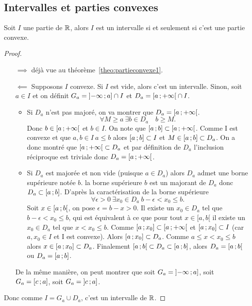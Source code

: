 \subsection{Intervalles et parties convexes}

\begin{theo}
  Soit \(I\) une partie de \(\mathbb{R}\), alors \(I\) est un intervalle si et seulement si c'est une partie convexe.
\end{theo}
\begin{proof}
  \begin{itemize}
  \item[\(\implies\)] déjà vue au théorème~\ref{theo:partieconvexe1}.
  \item[\(\impliedby\)] Supposons \(I\) convexe. Si \(I\) est vide, alors c'est un intervalle. Sinon, soit \(a\in I\) et on définit \(G_a=\left] -\infty \, ;  a \right]\cap I\) et \(D_a=\left[ a \, ;  +\infty \right[\cap I\).
    \begin{itemize}
    \item Si \(D_a\) n'est pas majoré, on va montrer que \(D_a=\left[ a \, ;  +\infty \right[\).
      \begin{equation}
        \forall M \geqslant a \ \exists b \in D_a \quad b\geqslant M.
      \end{equation}
      Donc \(b\in \left[ a \, ;  +\infty \right[\) et \(b\in I\). On note que \(\left[ a \, ;  b \right]\subset \left[ a \, ;  +\infty \right[\). Comme I est convexe et que \(a,b \in I \ a \leqslant b\) alors \(\left[ a \, ;  b \right]\subset I\) et \(M\in \left[ a \, ;  b \right] \subset D_a\). On a donc montré que \(\left[ a \, ;  +\infty \right[ \subset D_a\) et par définition de \(D_a\) l'inclusion réciproque est triviale donc \(D_a=\left[ a \, ;  +\infty \right[\).
    \item Si \(D_a\) est majorée et non vide (puisque \(a\in D_a\)) alors \(D_a\) admet une borne supérieure notée \(b\). la borne supérieure \(b\) est un majorant de \(D_a\) donc \(D_a \subset \left[ a \, ;  b \right]\). D'après la caractérisation de la borne supérieure
      \begin{equation}
        \forall \epsilon >0 \ \exists x_0 \in D_a \ b-\epsilon < x_0\leqslant b.
      \end{equation}
      Soit \(x\in \left[ a \, ;  b \right[\), on pose \(\epsilon=b-x>0\). Il existe un \(x_0\in D_a\) tel que \(b-\epsilon<x_0 \leqslant b\), qui est équivalent à ce que pour tout \(x\in[a,b[\) il existe un \(x_0\in D_a\) tel que \(x<x_0 \leqslant b\). Comme \(\left[ a \, ;  x_0 \right]\subset \left[ a \, ;  +\infty \right[\) et \(\left[ a \, ;  x_0 \right]\subset I\) (car \(a,x_0 \in I\) et I est convexe). Alors \(\left[ a \, ;  x_0 \right] \subset D_a\). Comme \(a\leqslant x < x_0\leqslant b\) alors \(x\in \left[ a \, ;  x_0 \right]\subset D_a\). Finalement \(\left[ a \, ;  b \right[\subset D_a \subset \left[ a \, ;  b \right]\), alors \(D_a=\left[ a \, ;  b \right[\) ou \(D_a=\left[ a \, ;  b \right]\).
    \end{itemize}
    De la même manière, on peut montrer que soit \(G_a=\left] -\infty \, ;  a \right]\), soit \(G_a=\left[ c \, ;  a \right]\), soit \(G_a=\left] c \, ;  a \right]\).
  \end{itemize}
  Donc comme \(I=G_a\cup D_a\), c'est un intervalle de \(\mathbb{R}\).
\end{proof}

